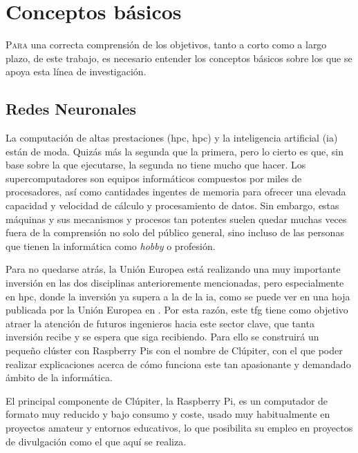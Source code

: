 \chapter{Conceptos básicos}
\label{chap:conceptos_basicos}

\lettrine{P}{ara} una correcta comprensión de los objetivos, tanto a corto como a largo plazo, de este trabajo, es necesario entender los conceptos básicos sobre los que se apoya esta línea de investigación.

\section{Redes Neuronales}
\label{sec:redes_neuronales}

La computación de altas prestaciones (\acrshort{hpc}, \acrlong{hpc}) y la inteligencia artificial (\acrshort{ia}) están de moda. Quizás más la segunda que la primera, pero lo cierto es que, sin base sobre la que ejecutarse, la segunda no tiene mucho que hacer.
Los supercomputadores son equipos informáticos compuestos por miles de procesadores, así como cantidades ingentes de memoria para ofrecer una elevada capacidad y velocidad de cálculo y procesamiento de datos.
Sin embargo, estas máquinas y sus mecanismos y procesos tan potentes suelen quedar muchas veces fuera de la comprensión no solo del público general, sino incluso de las personas que tienen la informática como \textit{hobby} o profesión.

Para no quedarse atrás, la Unión Europea está realizando una muy importante inversión en las dos disciplinas anterioremente mencionadas, pero especialmente en \acrshort{hpc}, donde la inversión ya supera a la de la \acrshort{ia}, como se puede ver en una hoja publicada por la Unión Europea en \cite{eu_factsheet_digital}.
Por esta razón, este \acrshort{tfg} tiene como objetivo atraer la atención de futuros ingenieros hacia este sector clave, que tanta inversión recibe y se espera que siga recibiendo. Para ello se construirá un pequeño clúster con Raspberry Pis con el nombre de Clúpiter, con el que poder realizar explicaciones acerca de cómo funciona este tan apasionante y demandado ámbito de la informática.

El principal componente de Clúpiter, la Raspberry Pi, es un computador de formato muy reducido y bajo consumo y coste, usado muy habitualmente en proyectos amateur y entornos educativos, lo que posibilita su empleo en proyectos de divulgación como el que aquí se realiza.
